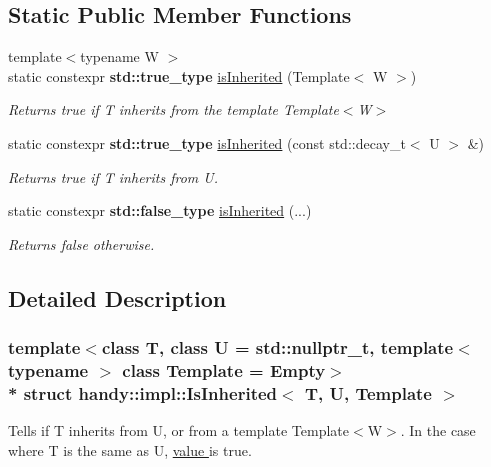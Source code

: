 \subsection*{Static Public Member Functions}
\begin{DoxyCompactItemize}
\item 
{\footnotesize template$<$typename W $>$ }\\static constexpr {\bf std\+::true\+\_\+type} \hyperlink{structhandy_1_1impl_1_1IsInherited_ab35b0bbac7a0a30321f1e9f97f66c9c4}{is\+Inherited} (Template$<$ W $>$)
\begin{DoxyCompactList}\small\item\em Returns {\ttfamily true} if {\ttfamily T} inherits from the template {\ttfamily Template$<$\+W$>$} \end{DoxyCompactList}\item 
static constexpr {\bf std\+::true\+\_\+type} \hyperlink{structhandy_1_1impl_1_1IsInherited_ad6960a3bde384c00493a40cf4f6cbd23}{is\+Inherited} (const std\+::decay\+\_\+t$<$ U $>$ \&)
\begin{DoxyCompactList}\small\item\em Returns {\ttfamily true} if {\ttfamily T} inherits from {\ttfamily U}. \end{DoxyCompactList}\item 
static constexpr {\bf std\+::false\+\_\+type} \hyperlink{structhandy_1_1impl_1_1IsInherited_acc033894644bd14ea55b4963e1f4f040}{is\+Inherited} (...)
\begin{DoxyCompactList}\small\item\em Returns {\ttfamily false} otherwise. \end{DoxyCompactList}\end{DoxyCompactItemize}


\subsection{Detailed Description}
\subsubsection*{template$<$class T, class U = std\+::nullptr\+\_\+t, template$<$ typename $>$ class Template = Empty$>$\\*
struct handy\+::impl\+::\+Is\+Inherited$<$ T, U, Template $>$}

Tells if {\ttfamily T} inherits from {\ttfamily U}, or from a template {\ttfamily Template$<$\+W$>$}. In the case where {\ttfamily T} is the same as {\ttfamily U}, \hyperlink{structhandy_1_1impl_1_1IsInherited_ade331c690ccfcc4c9fbe160b83f9491ba3347f5ab27dd0282a949005f868dcde7}{value } is {\ttfamily true}. 


